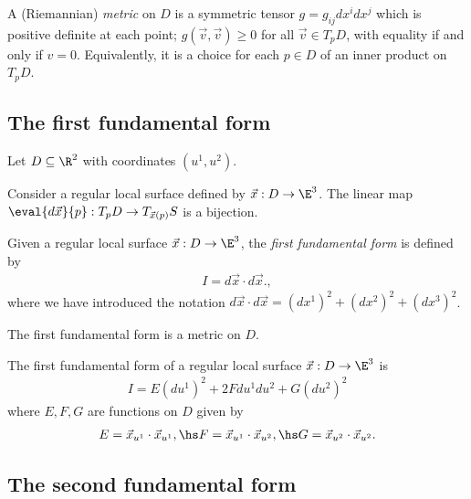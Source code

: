 \documentclass{article}
\begin{document}
\begin{definition}
    A (Riemannian) \emph{metric} on $D$ is a symmetric tensor $g=g_{ij}dx^idx^j$ 
    which is positive definite at each point; $g(\vec v,\vec v)\geq 0$ for all
    $\vec v \in T_pD$, with equality if and only if $v=0$. Equivalently, it is a 
    choice for each $p\in D$ of an inner product on $T_pD$.
\end{definition}

\subsection{The first fundamental form}

Let $D\subseteq\R^2$ with coordinates $(u^1,u^2)$.

\begin{proposition}[Notes 7.5]
    Consider a regular local surface defined by $\vec x: D\to \E^3$. The linear map
    $\eval{d\vec x}{p}:T_pD\to T_{\vec x(p)}S$ is a bijection.
\end{proposition}

\begin{definition}
    Given a regular local surface $\vec x: D\to\E^3$, the \emph{first fundamental form}
    is defined by 
    \begin{align*}
        I = d\vec x \cdot d\vec x.,
    \end{align*}
    where we have introduced the notation $d\vec x\cdot d\vec x=(dx^1)^2+(dx^2)^2+(dx^3)^2$.
\end{definition}

\begin{proposition}[Notes 7.9]
    The first fundamental form is a metric on $D$.
\end{proposition}

\begin{proposition}[Notes 7.10]
    The first fundamental form of a regular local surface $\vec x:D\to\E^3$ is
    \begin{align*}
        I = E(du^1)^2 + 2Fdu^1du^2+ G(du^2)^2
    \end{align*}
    where $E,F,G$ are functions on $D$ given by
    \begin{align}
        \label{fff}
        E=\vec x_{u^1} \cdot \vec x_{u^1},\hs 
        F=\vec x_{u^1} \cdot \vec x_{u^2},\hs 
        G=\vec x_{u^2} \cdot \vec x_{u^2}.
    \end{align}
\end{proposition}

\subsection{The second fundamental form}
\end{document}
